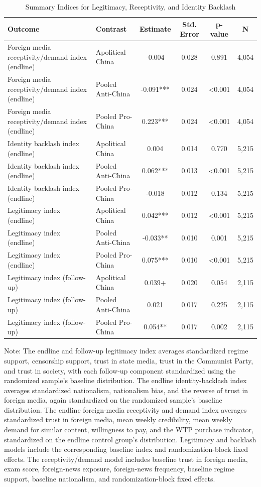 \begin{table}[H]
\centering
\caption{Summary Indices for Legitimacy, Receptivity, and Identity Backlash}
\label{tab:summary_indices}
\footnotesize
\begin{threeparttable}
\begin{tabular}{llcccc}
\toprule
Outcome & Contrast & Estimate & Std. Error & p-value & N \\
\midrule
Foreign media receptivity/demand index (endline) & Apolitical China & -0.004 & 0.028 & 0.891 & 4,054 \\
Foreign media receptivity/demand index (endline) & Pooled Anti-China & -0.091*** & 0.024 & <0.001 & 4,054 \\
Foreign media receptivity/demand index (endline) & Pooled Pro-China & 0.223*** & 0.024 & <0.001 & 4,054 \\
Identity backlash index (endline) & Apolitical China & 0.004 & 0.014 & 0.770 & 5,215 \\
Identity backlash index (endline) & Pooled Anti-China & 0.062*** & 0.013 & <0.001 & 5,215 \\
Identity backlash index (endline) & Pooled Pro-China & -0.018 & 0.012 & 0.134 & 5,215 \\
Legitimacy index (endline) & Apolitical China & 0.042*** & 0.012 & <0.001 & 5,215 \\
Legitimacy index (endline) & Pooled Anti-China & -0.033** & 0.010 & 0.001 & 5,215 \\
Legitimacy index (endline) & Pooled Pro-China & 0.075*** & 0.010 & <0.001 & 5,215 \\
Legitimacy index (follow-up) & Apolitical China & 0.039+ & 0.020 & 0.054 & 2,115 \\
Legitimacy index (follow-up) & Pooled Anti-China & 0.021 & 0.017 & 0.225 & 2,115 \\
Legitimacy index (follow-up) & Pooled Pro-China & 0.054** & 0.017 & 0.002 & 2,115 \\
\bottomrule
\end{tabular}
\begin{tablenotes}[flushleft]
\footnotesize
\item Note: The endline and follow-up legitimacy index averages standardized regime support, censorship support, trust in state media, trust in the Communist Party, and trust in society, with each follow-up component standardized using the randomized sample's baseline distribution. The endline identity-backlash index averages standardized nationalism, nationalism bias, and the reverse of trust in foreign media, again standardized on the randomized sample's baseline distribution. The endline foreign-media receptivity and demand index averages standardized trust in foreign media, mean weekly credibility, mean weekly demand for similar content, willingness to pay, and the WTP purchase indicator, standardized on the endline control group's distribution. Legitimacy and backlash models include the corresponding baseline index and randomization-block fixed effects. The receptivity/demand model includes baseline trust in foreign media, exam score, foreign-news exposure, foreign-news frequency, baseline regime support, baseline nationalism, and randomization-block fixed effects.

\end{tablenotes}
\end{threeparttable}
\end{table}

